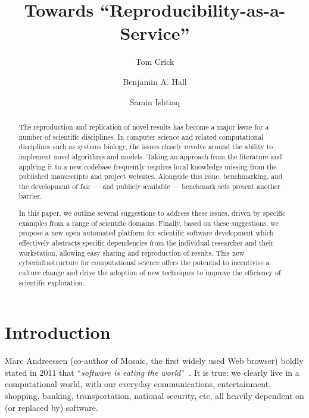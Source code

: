 \documentclass[a4paper,11pt]{article}
\title{Towards ``Reproducibility-as-a-Service''}
\author[1]{Tom Crick}
\author[2]{Benjamin A. Hall}
\author[3]{Samin Ishtiaq}
\affil[1]{Department of Computing \& Information Systems, Cardiff
  Metropolitan University, UK}
\affil[2]{MRC Cancer Unit, University of Cambridge, UK}
\affil[3]{Microsoft Research Cambridge, UK}
\affil[1]{\protect\url{tcrick@cardiffmet.ac.uk}}
\affil[2]{\protect\url{bh418@mrc-cu.cam.ac.uk}}
\affil[3]{\protect\url{samin.ishtiaq@microsoft.com}}
\date{ }
\begin{document}
\maketitle



\begin{abstract}
The reproduction and replication of novel results has become a major
issue for a number of scientific disciplines. In computer science and
related computational disciplines such as systems biology, the issues
closely revolve around the ability to implement novel algorithms and
models. Taking an approach from the literature and applying it to a
new codebase frequently requires local knowledge missing from the
published manuscripts and project websites. Alongside this issue,
benchmarking, and the development of fair --- and publicly available
--- benchmark sets present another barrier.

In this paper, we outline several suggestions to address these issues,
driven by specific examples from a range of scientific domains.
Finally, based on these suggestions, we propose a new open automated
platform for scientific software development which effectively
abstracts specific dependencies from the individual researcher and
their workstation, allowing easy sharing and reproduction of
results. This new cyberinfrastructure for computational science offers
the potential to incentivise a culture change and drive the adoption
of new techniques to improve the efficiency of scientific exploration.
\end{abstract}

\section{Introduction}

Marc Andreessen (co-author of Mosaic, the first widely used Web
browser) boldly stated in 2011 that ``{\emph{software is eating the
world}}''~\cite{andreessen:2011}. It is true: we clearly live in a
computational world, with our everyday communications, entertainment,
shopping, banking, transportation, national security, etc, all heavily
dependent on (or replaced by) software.
\end{document}
